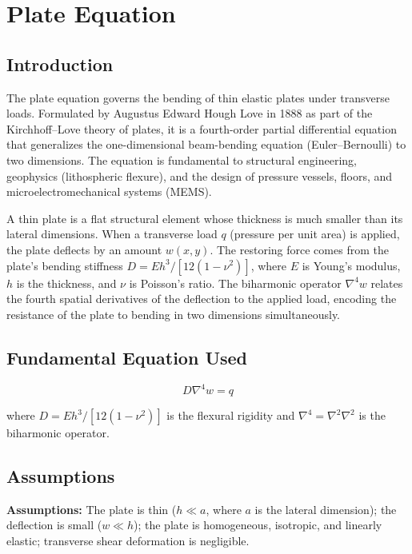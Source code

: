 \chapter{Plate Equation}

\section*{Introduction}

The plate equation governs the bending of thin elastic plates under transverse loads. Formulated by Augustus Edward Hough Love in 1888 as part of the Kirchhoff--Love theory of plates, it is a fourth-order partial differential equation that generalizes the one-dimensional beam-bending equation (Euler--Bernoulli) to two dimensions. The equation is fundamental to structural engineering, geophysics (lithospheric flexure), and the design of pressure vessels, floors, and microelectromechanical systems (MEMS).

A thin plate is a flat structural element whose thickness is much smaller than its lateral dimensions. When a transverse load $q$ (pressure per unit area) is applied, the plate deflects by an amount $w(x,y)$. The restoring force comes from the plate's bending stiffness $D = Eh^{3}/[12(1-\nu^{2})]$, where $E$ is Young's modulus, $h$ is the thickness, and $\nu$ is Poisson's ratio. The biharmonic operator $\nabla^{4}w$ relates the fourth spatial derivatives of the deflection to the applied load, encoding the resistance of the plate to bending in two dimensions simultaneously.
\section*{Fundamental Equation Used}

\begin{equation}
\boxed{\; D\nabla^{4}w = q\;}
\label{eq:plate}
\end{equation}

where $D = Eh^{3}/[12(1-\nu^{2})]$ is the flexural rigidity and $\nabla^{4} = \nabla^{2}\nabla^{2}$ is the biharmonic operator.
\section*{Assumptions}

\textbf{Assumptions:} The plate is thin ($h \ll a$, where $a$ is the lateral dimension); the deflection is small ($w \ll h$); the plate is homogeneous, isotropic, and linearly elastic; transverse shear deformation is negligible.



